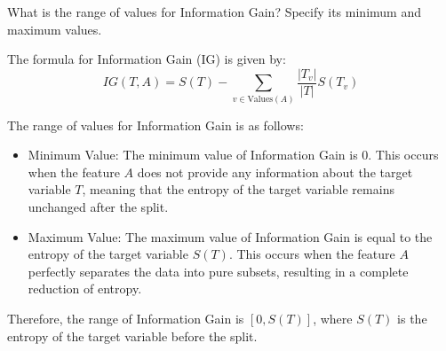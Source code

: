 \documentclass[12pt]{article}
\begin{document}
    \begin{ejercicio}
        What is the range of values for Information Gain? Specify its minimum and maximum values.

        The formula for Information Gain (IG) is given by:
        \[ IG(T, A) = S(T) - \sum_{v \in \text{Values}(A)} \frac{|T_v|}{|T|} S(T_v) \]

        The range of values for Information Gain is as follows:
        \begin{itemize}
            \item Minimum Value: The minimum value of Information Gain is $0$. This occurs when the feature $A$ does not provide any information about the target variable $T$, meaning that the entropy of the target variable remains unchanged after the split.
            \item Maximum Value: The maximum value of Information Gain is equal to the entropy of the target variable $S(T)$. This occurs when the feature $A$ perfectly separates the data into pure subsets, resulting in a complete reduction of entropy.
        \end{itemize}
        Therefore, the range of Information Gain is $[0, S(T)]$, where $S(T)$ is the entropy of the target variable before the split.
    \end{ejercicio}
\end{document}
